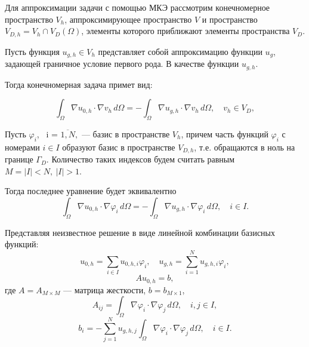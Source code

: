 \documentclass[12pt, a4paper]{article}
\renewcommand{\phi}{\varphi}
\begin{document}
			Для аппроксимации задачи с помощью МКЭ рассмотрим конечномерное пространство $V_h$, аппроксимирующее пространство $V$ и пространство 
			$V_{D,h} = V_h \cap V_D(\Omega)$, элементы которого приближают элементы пространства $V_D$. 
			
			Пусть функция $u_{g,h} \in V_h $ представляет собой аппроксимацию функции $u_g$, задающей граничное условие первого рода. В качестве функции $u_{g,h}$. 
			
			Тогда конечномерная задача примет вид: 
			
			\begin{equation*}
				\int_{\Omega} \nabla u_{0,h} \cdot \nabla v_{h} \, d\Omega = 
				- \int_{\Omega} \nabla u_{g,h} \cdot \nabla v_{h} \, d\Omega, \quad v_{h} \in V_D,
			\end{equation*}
			
			Пусть $\phi_i$, \ i = $\overline{1, N},$ --- базис в пространстве $V_h$, причем часть функций $\phi_i$ с номерами $i \in I$ образуют базис в пространстве $V_{D,h}$, т.е. обращаются в ноль на границе $\Gamma_D$. Количество таких индексов будем считать равным $M = |I| < N,\ |I| > 1$.
			
			Тогда последнее уравнение будет эквивалентно
			\begin{equation*}
				\int_{\Omega} \nabla u_{0,h} \cdot \nabla \phi_{i} \, d\Omega = 
				- \int_{\Omega} \nabla u_{g,h} \cdot \nabla \phi_{i} \, d\Omega, \quad i \in I.
			\end{equation*}
			
			Представляя неизвестное решение в виде линейной комбинации базисных функций:
			\begin{equation*}
				u_{0,h} = \sum_{i \in I} u_{0,h,i} \phi_i, \quad 
				u_{g,h} = \sum_{i = 1}^{N} u_{g,h,i} \phi_i, 
			\end{equation*}
			\begin{equation*}
				A u_{0,h} = b,
			\end{equation*}
			где $A = A_{M \times M}$ --- матрица жесткости, $b = b_{M \times 1}$,
			\begin{equation}
				A_{ij} = \int_{\Omega} \nabla \phi_i \cdot \nabla \phi_j \, d\Omega,
				\quad i, j\in I,
				\label{A_stiff_first}				
			\end{equation}
			\begin{equation}
				b_i = - \sum_{j=1}^{N} u_{g,h, j} \int_{\Omega} \nabla \phi_i  \cdot \nabla \phi_j \, d\Omega, \quad i \in I.
				\label{b_stiff_first}
			\end{equation}
			
\end{document}
